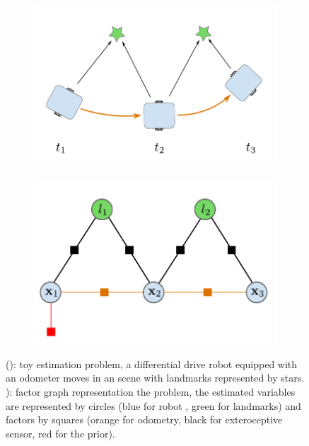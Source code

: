 \begin{figure}[h]
    \centering
    \begin{subfigure}{.49\linewidth}
        \centering
        \includegraphics[width=\textwidth]{figures/toy_example.pdf}
        \caption{\label{fig:toy_problem}}
    \end{subfigure}%
    \hfill
    \begin{subfigure}{.49\linewidth}
        \centering
        \includegraphics[width=\textwidth]{figures/toy_factor.pdf}
        \caption{\label{fig:toy_factor}}
    \end{subfigure}%
    \caption{(): toy estimation problem, a differential drive robot equipped with an odometer moves in 
    an scene with landmarks represented by stars. ): factor graph representation the problem, the estimated variables are represented by circles 
    (blue for robot \keyframe, green for landmarks) and factors by squares (orange for odometry, black for exteroceptive sensor, red for the prior).}
\end{figure}

